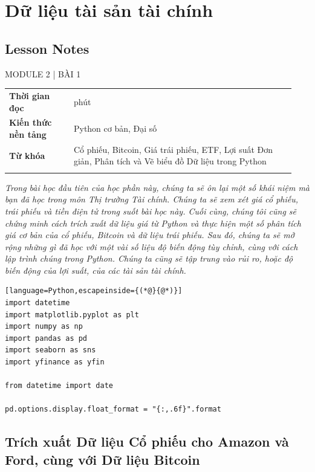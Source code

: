 \chapter{Dữ liệu tài sản tài chính}
\label{ch:M2L1}


\section*{Lesson Notes}

MODULE 2 | BÀI 1

{\small
\begin{longtable}{>{\raggedright\arraybackslash}p{0.213\linewidth}>{\raggedright\arraybackslash}p{0.727\linewidth}}
\toprule
\textbf{Thời gian đọc} & 60 phút \\
\addlinespace[2pt]
\textbf{Kiến thức nền tảng} & Python cơ bản, Đại số \\
\addlinespace[2pt]
\textbf{Từ khóa} & Cổ phiếu, Bitcoin, Giá trái phiếu, ETF, Lợi suất Đơn giản, Phân tích và Vẽ biểu đồ Dữ liệu trong Python \\
\addlinespace[2pt]
\bottomrule
\end{longtable}
}

\emph{Trong bài học đầu tiên của học phần này, chúng ta sẽ ôn lại một số khái niệm mà bạn đã học trong môn Thị trường Tài chính. Chúng ta sẽ xem xét giá cổ phiếu, trái phiếu và tiền điện tử trong suốt bài học này. Cuối cùng, chúng tôi cũng sẽ chứng minh cách trích xuất dữ liệu giá từ Python và thực hiện một số phân tích giá cơ bản của cổ phiếu, Bitcoin và dữ liệu trái phiếu. Sau đó, chúng ta sẽ mở rộng những gì đã học với một vài số liệu độ biến động tùy chỉnh, cùng với cách lập trình chúng trong Python. Chúng ta cũng sẽ tập trung vào rủi ro, hoặc độ biến động của lợi suất, của các tài sản tài chính.}

\begin{lstlisting}[language=Python,escapeinside={(*@}{@*)}]
import datetime
import matplotlib.pyplot as plt
import numpy as np
import pandas as pd
import seaborn as sns
import yfinance as yfin

from datetime import date

pd.options.display.float_format = "{:,.6f}".format
\end{lstlisting}

\section{Trích xuất Dữ liệu Cổ phiếu cho Amazon và Ford, cùng với Dữ liệu Bitcoin}

